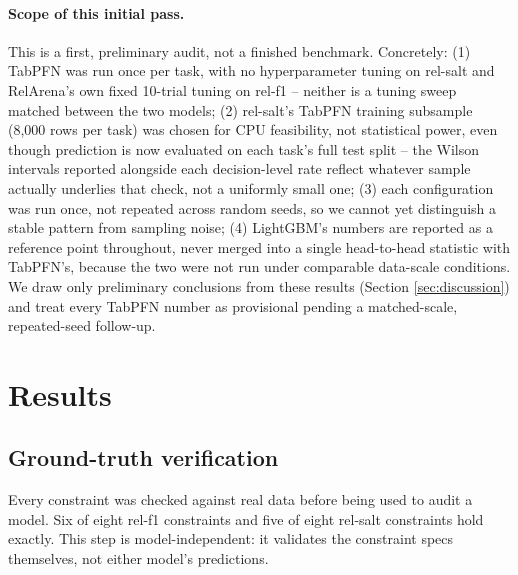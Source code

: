 \documentclass[11pt]{article}
\begin{document}
\paragraph{Scope of this initial pass.} This is a first, preliminary audit, not a finished
benchmark. Concretely: (1) TabPFN was run once per task, with no hyperparameter tuning on
rel-salt and RelArena's own fixed 10-trial tuning on rel-f1 -- neither is a tuning sweep
matched between the two models; (2) rel-salt's TabPFN training subsample (8{,}000 rows per
task) was chosen for CPU feasibility, not statistical power, even though prediction is now
evaluated on each task's full test split -- the Wilson intervals reported alongside each
decision-level rate reflect whatever sample actually underlies that check, not a uniformly
small one; (3) each configuration was run once, not repeated across random seeds,
so we cannot yet distinguish a stable pattern from sampling noise; (4) LightGBM's numbers are
reported as a reference point throughout, never merged into a single head-to-head statistic
with TabPFN's, because the two were not run under comparable data-scale conditions. We draw
only preliminary conclusions from these results (Section \ref{sec:discussion}) and treat every
TabPFN number as provisional pending a matched-scale, repeated-seed follow-up.

\section{Results}

\subsection{Ground-truth verification}

Every constraint was checked against real data before being used to audit a model. Six of
eight rel-f1 constraints and five of eight rel-salt constraints hold exactly. This step is
model-independent: it validates the constraint specs themselves, not either model's
predictions.
\end{document}
